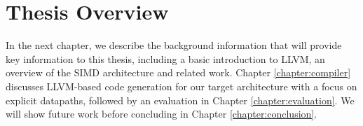 

\section{Thesis Overview}


In the next chapter, we describe the background information that will provide key information to this thesis, including a basic introduction to LLVM, an overview of the SIMD architecture and related work. Chapter \ref{chapter:compiler} discusses LLVM-based code generation for our target architecture with a focus on explicit datapaths, followed by an evaluation in Chapter \ref{chapter:evaluation}. We will show future work %
before concluding in Chapter \ref{chapter:conclusion}.


